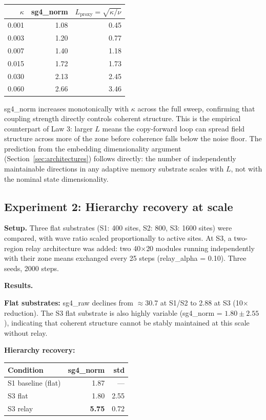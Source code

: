 \documentclass[12pt]{article}
\begin{document}
\begin{center}
\begin{tabular}{rrr}
\toprule
$\kappa$ & sg4\_norm & $L_{\text{proxy}} = \sqrt{\kappa/\nu}$ \\
\midrule
0.001 & 1.08 & 0.45 \\
0.003 & 1.20 & 0.77 \\
0.007 & 1.40 & 1.18 \\
0.015 & 1.72 & 1.73 \\
0.030 & 2.13 & 2.45 \\
0.060 & 2.66 & 3.46 \\
\bottomrule
\end{tabular}
\end{center}

sg4\_norm increases monotonically with $\kappa$ across the full sweep, confirming that coupling strength directly controls coherent structure. This is the empirical counterpart of Law 3: larger $L$ means the copy-forward loop can spread field structure across more of the zone before coherence falls below the noise floor. The prediction from the embedding dimensionality argument (Section~\ref{sec:architectures}) follows directly: the number of independently maintainable directions in any adaptive memory substrate scales with $L$, not with the nominal state dimensionality.

\subsection{Experiment 2: Hierarchy recovery at scale}
\label{sec:exp2}

\textbf{Setup.} Three flat substrates (S1: 400 sites, S2: 800, S3: 1600 sites) were compared, with wave ratio scaled proportionally to active sites. At S3, a two-region relay architecture was added: two 40$\times$20 modules running independently with their zone means exchanged every 25 steps (relay\_alpha = 0.10). Three seeds, 2000 steps.

\textbf{Results.}

\textbf{Flat substrates:} sg4\_raw declines from $\approx$30.7 at S1/S2 to 2.88 at S3 (10$\times$ reduction). The S3 flat substrate is also highly variable (sg4\_norm = $1.80 \pm 2.55$), indicating that coherent structure cannot be stably maintained at this scale without relay.

\textbf{Hierarchy recovery:}
\begin{center}
\begin{tabular}{lrr}
\toprule
Condition & sg4\_norm & std \\
\midrule
S1 baseline (flat)  & 1.87 & --- \\
S3 flat             & 1.80 & 2.55 \\
S3 relay            & \textbf{5.75} & 0.72 \\
\bottomrule
\end{tabular}
\end{center}
\end{document}
